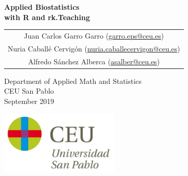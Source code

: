 \begin{titlepage}
\thispagestyle{empty}
\vspace*{7cm}
\par

\begin{center}
\normalfont\fontsize{30}{30}\selectfont
{\bfseries \color{blueceu}Applied Biostatistics\\ with R and rk.Teaching}
\end{center}
\vspace{1cm}

\begin{center}
\Large
\begin{tabular}{c}
Juan Carlos Garro Garro (\url{garro.eps@ceu.es})\\
Nuria Caballé Cervigón (\url{nuria.caballecervigon@ceu.es})\\
Alfredo Sánchez Alberca (\url{asalber@ceu.es})\\
\end{tabular}

\medskip 
Department of Applied Math and Statistics\\ CEU San Pablo\\[1cm]
\medskip 
September 2019

\vspace{1cm}
\includegraphics[height=3cm]{img/logo_uspceu}
\end{center}
\vfill
\end{titlepage}